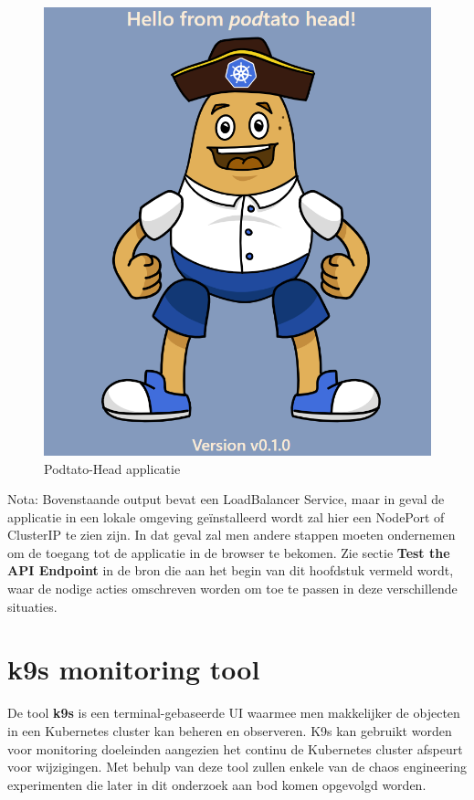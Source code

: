 \begin{figure}[h]
    \centering
    \includegraphics[scale=.5]{img/podtatohead-app.png}
    \caption{Podtato-Head applicatie}
    \label{img:podtato-head}
\end{figure}

Nota: Bovenstaande output bevat een LoadBalancer Service, maar in geval de applicatie in een lokale omgeving geïnstalleerd wordt zal hier een NodePort of ClusterIP te zien zijn. In dat geval zal men andere stappen moeten ondernemen om de toegang tot de applicatie in de browser te bekomen. 
Zie sectie {\bf Test the API Endpoint} in de bron die aan het begin van dit hoofdstuk vermeld wordt, waar de nodige acties omschreven worden om toe te passen in deze verschillende situaties.  

\section{k9s monitoring tool}

De tool {\bf k9s} is een terminal-gebaseerde UI waarmee men makkelijker de objecten in een Kubernetes cluster kan beheren en observeren. K9s kan gebruikt worden voor monitoring doeleinden aangezien het continu de Kubernetes cluster afspeurt voor wijzigingen. Met behulp van deze tool zullen enkele van de chaos engineering experimenten die later in dit onderzoek aan bod komen opgevolgd worden.

